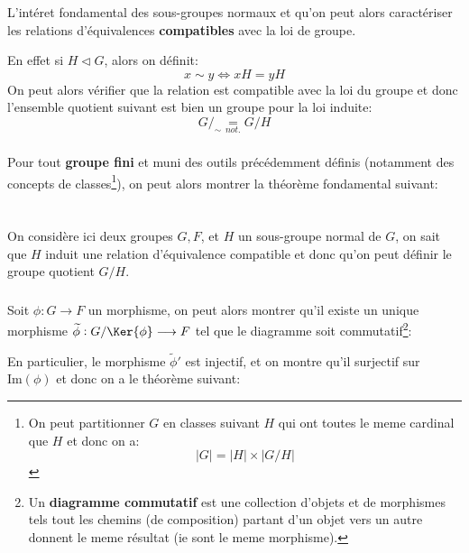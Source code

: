 \subsection*{}
L'intéret fondamental des sous-groupes normaux et qu'on peut alors caractériser les relations d'équivalences \textbf{compatibles} avec la loi de groupe.\<

En effet si \(H \lhd G\), alors on définit:
\[
   x \sim y \Longleftrightarrow xH = yH
\]
On peut alors vérifier que la relation est compatible avec la loi du groupe et donc l'ensemble quotient suivant est bien un groupe pour la loi induite:
\[
   G/_\sim \underset{not.}{=} G/H
\]
\subsection*{}
Pour tout \textbf{groupe fini} et muni des outils précédemment définis (notamment des concepts de classes\footnote[1]{On peut partitionner \(G\) en classes suivant \(H\) qui ont toutes le meme cardinal que \(H\) et donc on a:\[
   |G| = |H| \times |G/H|\]}), on peut alors montrer la théorème fondamental suivant:
\begin{center}
\end{center}

\chapter*{}
On considère ici deux groupes \(G, F\), et \(H\) un sous-groupe normal de \(G\), on sait que \(H\) induit une relation d'équivalence compatible et donc qu'on peut définir le groupe quotient \(G/H\).\<

\subsection*{}
Soit \(\phi : G \longrightarrow F\) un morphisme, on peut alors montrer qu'il existe un unique morphisme \(\widetilde{\phi} : G/\Ker{\phi} \longrightarrow F\) tel que le diagramme soit commutatif\footnote[1]{Un \textbf{diagramme commutatif} est une collection d'objets et de morphismes tels tout les chemins (de composition) partant d'un objet vers un autre donnent le meme résultat (ie sont le meme morphisme).}:
\begin{center}
\end{center}
En particulier, le morphisme \(\widetilde{\phi}'\) est injectif, et on montre qu'il surjectif sur \(\text{Im}(\phi)\) et donc on a le théorème suivant:
